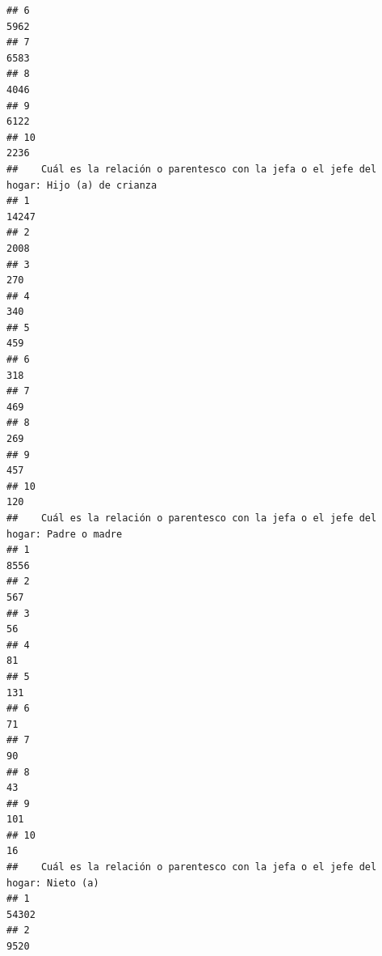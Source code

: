 \documentclass[11pt,]{article}
\begin{document}
\begin{verbatim}
## 6                                                                        5962
## 7                                                                        6583
## 8                                                                        4046
## 9                                                                        6122
## 10                                                                       2236
##    Cuál es la relación o parentesco con la jefa o el jefe del hogar: Hijo (a) de crianza
## 1                                                                                  14247
## 2                                                                                   2008
## 3                                                                                    270
## 4                                                                                    340
## 5                                                                                    459
## 6                                                                                    318
## 7                                                                                    469
## 8                                                                                    269
## 9                                                                                    457
## 10                                                                                   120
##    Cuál es la relación o parentesco con la jefa o el jefe del hogar: Padre o madre
## 1                                                                             8556
## 2                                                                              567
## 3                                                                               56
## 4                                                                               81
## 5                                                                              131
## 6                                                                               71
## 7                                                                               90
## 8                                                                               43
## 9                                                                              101
## 10                                                                              16
##    Cuál es la relación o parentesco con la jefa o el jefe del hogar: Nieto (a)
## 1                                                                        54302
## 2                                                                         9520

\end{verbatim}
\end{document}
